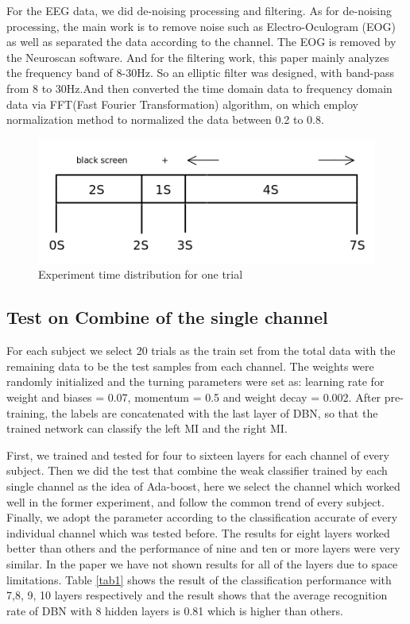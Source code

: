 \documentclass{llncs}
\begin{document}
For the EEG data, we did de-noising processing and filtering. As for de-noising processing, the main work is to remove noise such as Electro-Oculogram (EOG) as well as separated the data according to the channel. The EOG is removed by the Neuroscan software. And for the filtering work, this paper mainly analyzes the frequency band of 8-30Hz. So an elliptic filter was designed, with band-pass from 8 to 30Hz.And then converted the time domain data to frequency domain data via FFT(Fast Fourier Transformation) algorithm, on which employ normalization method to normalized the data between 0.2 to 0.8.  
\begin{figure}[!htbp]
	\centering  
		\includegraphics[scale=0.25]{figs/ax2.png}
		\caption{Experiment time distribution for one trial}
    	\label{fig:3}
\end{figure}

\subsection{Test on Combine of the single channel}
For each subject we select 20 trials as the train set from the total data with the remaining data to be the test samples from each channel. The weights were randomly initialized and the turning parameters were set as: learning rate for weight and biases = 0.07, momentum = 0.5 and weight decay = 0.002. After pre-training, the labels are concatenated with the last layer of DBN, so that the trained network can classify the left MI and the right MI.


First, we trained and tested for four to sixteen layers for each channel of every subject. Then we did the test that combine the weak classifier trained by each single channel as the idea of Ada-boost, here we select the channel which worked well in the former experiment, and follow the common trend of every subject. Finally, we adopt the parameter  according to the classification accurate of every individual channel which was tested before. The results for eight layers worked better than others and the performance of nine and ten or more layers were very similar. In the paper we have not shown results for all of the layers due to space limitations. Table \ref{tab1} shows the result of the classification performance with 7,8, 9, 10 layers respectively and the result shows that the average recognition rate of DBN with 8 hidden layers is 0.81 which is higher than others.
\end{document}
